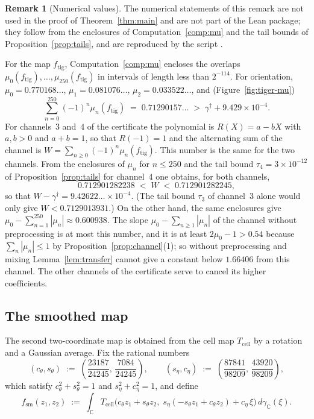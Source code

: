 \documentclass[11pt,reqno]{amsart}
\theoremstyle{definition}
\newtheorem{remark}[theorem]{Remark}
\numberwithin{equation}{section}
\newcommand{\C}{\mathbb{C}}
\newcommand{\gd}{\gamma^\dagger}
\newcommand{\gC}{\gamma_{\C}}
\newcommand{\Tcell}{T_{\mathrm{cell}}}
\newcommand{\ftig}{f_{\mathrm{tig}}}
\newcommand{\fsm}{f_{\mathrm{sm}}}
\begin{document}
\begin{remark}[Numerical values]\label{rem:W-tig}
The numerical statements of this remark are not used in the proof of Theorem~\ref{thm:main} and are not part of the Lean package; they follow from the enclosures of Computation~\ref{comp:mu} and the tail bounds of Proposition~\ref{prop:tails}, and are reproduced by the script .

For the map $\ftig$, Computation~\ref{comp:mu} encloses the overlaps $\mu_0(\ftig),\dots,\mu_{250}(\ftig)$ in intervals of length less than $2^{-114}$. For orientation, $\mu_0=0.770168\ldots$, $\mu_1=0.081076\ldots$, $\mu_2=0.033522\ldots$, and (Figure~\ref{fig:tiger-mu})
\[
  \sum_{n=0}^{250} (-1)^n \mu_n(\ftig) \;=\; 0.71290157\ldots \;>\; \gd + 9.429 \times 10^{-4}.
\]
For channels~$3$ and~$4$ of the certificate the polynomial is $R(X)=a-bX$ with $a,b>0$ and $a+b=1$, so that $R(-1)=1$ and the alternating sum of the channel is $W=\sum_{n\ge0}(-1)^n\mu_n(\ftig)$. This number is the same for the two channels. From the enclosures of $\mu_n$ for $n\le250$ and the tail bound $\tau_4=3\times10^{-12}$ of Proposition~\ref{prop:tails} for channel~$4$ one obtains, for both channels,
\begin{equation}\label{eq:W-tig}
  0.712901282238\;<\;W\;<\;0.712901282245 ,
\end{equation}
so that $W-\gd=9.42622\ldots\times10^{-4}$. (The tail bound $\tau_3$ of channel~$3$ alone would only give $W<0.7129013931$.) On the other hand, the same enclosures give $\mu_0-\sum_{n=1}^{250}|\mu_n|\approx0.600938$. The slope $\mu_0-\sum_{n\ge1}|\mu_n|$ of the channel without preprocessing is at most this number, and it is at least $2\mu_0-1>0.54$ because $\sum_n|\mu_n|\le1$ by Proposition~\ref{prop:channel}(1); so without preprocessing and mixing Lemma~\ref{lem:transfer} cannot give a constant below $1.66406$ from this channel. The other channels of the certificate serve to cancel its higher coefficients.
\end{remark}

\subsection{The smoothed map}\label{sec:smooth}
The second two-coordinate map is obtained from the cell map $\Tcell$ by a rotation and a Gaussian average. Fix the rational numbers
\begin{equation}\label{eq:smooth-params}
  (c_\theta, s_\theta) \;:=\; \left(\frac{23187}{24245},\, \frac{7084}{24245}\right),
  \qquad
  (s_\eta, c_\eta) \;:=\; \left(\frac{87841}{98209},\, \frac{43920}{98209}\right),
\end{equation}
which satisfy $c_\theta^2 + s_\theta^2 = 1$ and $s_\eta^2 + c_\eta^2 = 1$, and define
\begin{equation}\label{eq:smooth-map}
  \fsm(z_1, z_2) \;:=\; \int_{\C} \Tcell\!\Big(c_\theta z_1 + s_\theta z_2,\; s_\eta(-s_\theta z_1 + c_\theta z_2) + c_\eta\, \xi\Big)\, d\gC(\xi).
\end{equation}
\end{document}
